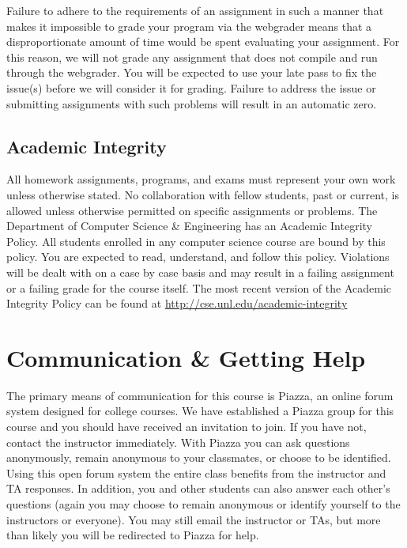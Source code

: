 \documentclass[12pt]{scrartcl}
\begin{document}

Failure to adhere to the requirements of an assignment in such 
a manner that makes it impossible to grade your program via 
the webgrader means that a disproportionate amount of time 
would be spent evaluating your assignment.  For this reason, 
we will not grade any assignment that does not compile and 
run through the webgrader.  You will be expected to use your 
late pass to fix the issue(s) before we will consider it for 
grading.  Failure to address the issue or submitting assignments 
with such problems will result in an automatic zero.

\subsection{Academic Integrity}

All homework assignments, programs, and exams must represent
your own work unless otherwise stated.  No collaboration with 
fellow students, past or current, is allowed unless otherwise 
permitted on specific assignments or problems.  The Department of
Computer Science \& Engineering has an Academic Integrity Policy.  
All students enrolled in any computer science course are bound 
by this policy.  You are expected to read, understand, and follow 
this policy.  Violations will be dealt with on a case by case 
basis and may result in a failing assignment or a failing grade 
for the course itself.  The most recent version of the Academic 
Integrity Policy can be found at \url{http://cse.unl.edu/academic-integrity}

\section{Communication \& Getting Help}

The primary means of communication for this course is Piazza, an online
forum system designed for college courses.  We have established a Piazza 
group for this course and you should have received an invitation to join.
If you have not, contact the instructor immediately.  With Piazza you 
can ask questions anonymously, remain anonymous to your classmates, or 
choose to be identified.  Using this open forum system the entire class 
benefits from the instructor and TA responses.  In addition, you and 
other students can also answer each other's questions (again you may
choose to remain anonymous or identify yourself to the instructors or
everyone).  You may still email the instructor or TAs, but more than 
likely you will be redirected to Piazza for help.
\end{document}
